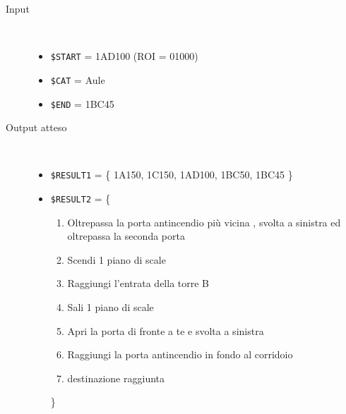 \documentclass[../../SperimentazioniPratiche.tex]{subfiles}
\begin{document}
			\begin{tcolorbox}[fonttitle=\bfseries, 
								adjusted title={\Large Prova 1C.1}, 
								breakable, 
								sharp corners=south,
								colback=white, 
								colframe=white!60!black]
								
				\begin{description}%
				
					\item[Input] \ \par 
        				\begin{itemize}
							\item \verb|$START| = 1AD100 (ROI = 01000) 
        					\item \verb|$CAT| = Aule
							\item \verb|$END| = 1BC45
        				\end{itemize}
        				
        			\tcbline 
        				
        			\item[Output atteso] \ \par
        				\begin{itemize}
        				
        					\item \verb|$RESULT1| = \{
        						1A150, 1C150, 1AD100, 1BC50, 1BC45
        					\}
        				
        					\item \verb|$RESULT2| = \{
        					\begin{enumerate}
        						\item Oltrepassa la porta antincendio più vicina , svolta a sinistra ed oltrepassa la seconda porta
        						\item Scendi 1 piano di scale
        						\item Raggiungi l'entrata della torre B
        						\item Sali 1 piano di scale
        						\item Apri la porta di fronte a te e svolta a sinistra
        						\item Raggiungi la porta antincendio in fondo al corridoio
        						\item destinazione raggiunta
        					\end{enumerate}
        					\}
        					
        				\end{itemize}

					\tcbline				
        				

\end{description}
\end{tcolorbox}
\end{document}
